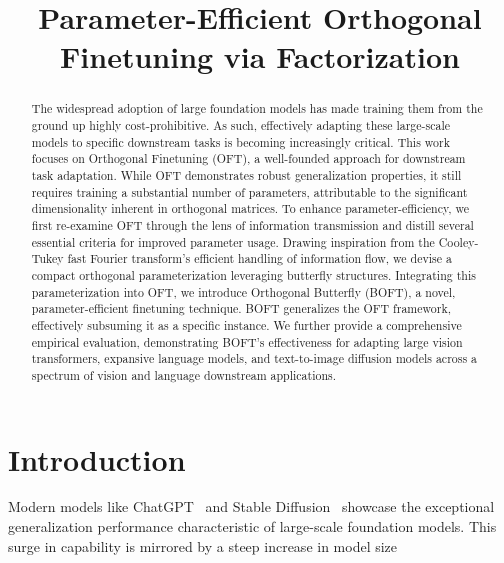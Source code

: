 \title{Parameter-Efficient Orthogonal Finetuning via Factorization}

\begin{abstract}
The widespread adoption of large foundation models has made training them from the ground up highly cost-prohibitive. As such, effectively adapting these large-scale models to specific downstream tasks is becoming increasingly critical. This work focuses on Orthogonal Finetuning (OFT), a well-founded approach for downstream task adaptation. While OFT demonstrates robust generalization properties, it still requires training a substantial number of parameters, attributable to the significant dimensionality inherent in orthogonal matrices. To enhance parameter-efficiency, we first re-examine OFT through the lens of information transmission and distill several essential criteria for improved parameter usage. Drawing inspiration from the Cooley-Tukey fast Fourier transform's efficient handling of information flow, we devise a compact orthogonal parameterization leveraging butterfly structures. Integrating this parameterization into OFT, we introduce Orthogonal Butterfly (BOFT), a novel, parameter-efficient finetuning technique. BOFT generalizes the OFT framework, effectively subsuming it as a specific instance. We further provide a comprehensive empirical evaluation, demonstrating BOFT's effectiveness for adapting large vision transformers, expansive language models, and text-to-image diffusion models across a spectrum of vision and language downstream applications.
\end{abstract}

\section{Introduction}

Modern models like ChatGPT~\cite{brown2020language,chen2021evaluating} and Stable Diffusion~\cite{rombach2022high} showcase the exceptional generalization performance characteristic of large-scale foundation models. This surge in capability is mirrored by a steep increase in model size

